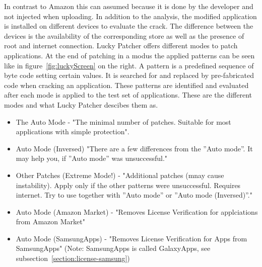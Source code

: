 In contrast to Amazon this can assumed because it is done by the developer and not injected when uploading.
\newline
In addition to the analysis, the modified application is installed on different devices to evaluate the crack.
The difference between the devices is the availability of the corresponding store as well as the presence of root and internet connection.
\newline
Lucky Patcher offers different modes to patch applications.
At the end of patching in a modus the applied patterns can be seen like in figure~\ref{fig:luckyScreen} on the right.
A pattern is a predefined sequence of byte code setting certain values.
It is searched for and replaced by pre-fabricated code when cracking an application.
These patterns are identified and evaluated after each mode is applied to the test set of applications.
\newline
These are the different modes and what Lucky Patcher descibes them as.
\begin{itemize}
\item The Auto Mode - "The minimal number of patches. Suitable for most applications with simple protection".
\item Auto Mode (Inversed) "There are a few differences from the ”Auto mode”. It may help you, if ”Auto mode” was unsuccessful."
\item Other Patches (Extreme Mode!) - "Additional patches (mnay cause instability). Apply only if the other patterns were unsuccessful. Requires internet. Try to use together with ”Auto mode” or ”Auto mode (Inversed)”."
\item Auto Mode (Amazon Market) - "Removes License Verification for applciations from Amazon Market"
\item Auto Mode (SamsungApps) - "Removes License Verification for Apps from SamsungApps" (Note: SamsungApps is called GalaxyApps, see subsection~\ref{section:license-samsung})
\end{itemize}
